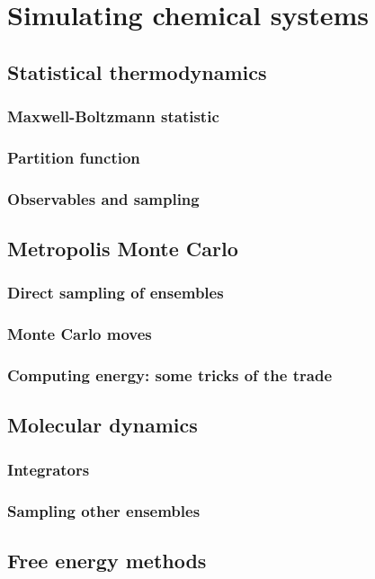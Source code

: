 \documentclass[thesis]{subfiles}
\begin{document}
\OnlyInSubfile{\setcounter{chapter}{2}}

\chapter{Simulating chemical systems}
\startcontents[chapters]
\printpartialtoc

\section{Statistical thermodynamics}


\subsection{Maxwell-Boltzmann statistic}

\subsection{Partition function}

\subsection{Observables and sampling}

\section{Metropolis Monte Carlo}

\subsection{Direct sampling of ensembles}

\subsection{Monte Carlo moves}

\subsection{Computing energy: some tricks of the trade}

\section{Molecular dynamics}

\subsection{Integrators}

\subsection{Sampling other ensembles}

\section{Free energy methods}


\OnlyInSubfile{\printbibliography}
\end{document}
